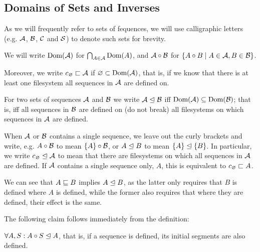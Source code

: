 

\subsection{Domains of Sets and Inverses}

\begin{mydef}
As we will frequently refer to sets of fequences,
we will use calligraphic letters (e.g. $\mathcal{A}$, $\mathcal{B}$, $\mathcal{C}$ and $\mathcal{S}$)
to denote such sets for brevity.

We will write $\textrm{Dom}({\mathcal{A}})$ for $\bigcap_{A\in\mathcal{A}} \textrm{Dom}({A})$,
and $\mathcal{A}\mathbin{\circ}\mathcal{B}$ for $\{A\mathbin{\circ} B\mathrel{|} A\in\mathcal{A}, B\in\mathcal{B}\}$.

Moreover, we write $c_\varnothing\sqsubset{\mathcal{A}}$ if $\varnothing \subset \textrm{Dom}({\mathcal{A}})$, that is,
if we know that there is at least one filesystem
all sequences in $\mathcal{A}$ are defined on.
\end{mydef}


\begin{mydef}[$\worksmeqsign$]
For two sets of sequences $\mathcal{A}$ and $\mathcal{B}$
we write ${\mathcal{A}}\trianglelefteq{\mathcal{B}}$ iff $\textrm{Dom}({\mathcal{A}}) \subseteq \textrm{Dom}({\mathcal{B}})$;
that is, iff all sequences in $\mathcal{B}$ are defined on (do not break)
all filesystems on which sequences in $\mathcal{A}$ are defined.
\end{mydef}

When $\mathcal{A}$ or $\mathcal{B}$ contains a single sequence,
we leave out the curly brackets and write,
e.g. $A\mathbin{\circ}\mathcal{B}$ to mean $\{A\}\mathbin{\circ}\mathcal{B}$,
or ${A}\trianglelefteq{B}$ to mean ${\{{A}\}}\trianglelefteq{\{{B}\}}$.
In particular, we write ${c_\varnothing}\trianglelefteq{\mathcal{A}}$ to mean that
there are filesystems on which all sequences in $\mathcal{A}$ are defined.
If $\mathcal{A}$ contains a single sequence only, $A$, this is equivalent to $c_\varnothing\sqsubset{A}$.

We can see that $A\sqsubseteq B$ implies ${A}\trianglelefteq{B}$, as the latter
only requires that $B$ is defined where $A$ is defined, 
while the former also requires
that where they are defined, their effect is the same.

The following claim follows immediately from the definition:

\begin{myclm}
$\forall A,S: {A\mathbin{\circ} S}\trianglelefteq{A}$, that is, if a sequence is defined,
its initial segments are also defined.
\end{myclm}

